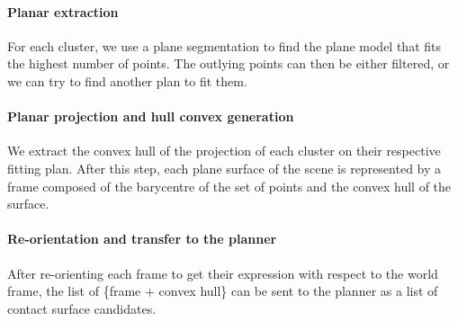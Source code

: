 \paragraph{Planar extraction}
For each cluster, we use a plane segmentation to find the plane model that fits the highest number of points.
The outlying points can then be either filtered, or we can try to find another plan to fit them.

\paragraph{Planar projection and hull convex generation}
We extract the convex hull of the projection of each cluster on their respective fitting plan.
After this step, each plane surface of the scene is represented by a frame composed of the barycentre of the set of points and the convex hull of the surface.

\paragraph{Re-orientation and transfer to the planner}
After re-orienting each frame to get their expression with respect to the world frame, the list of \{frame + convex hull\} can be sent to the planner as a list of contact surface candidates.



